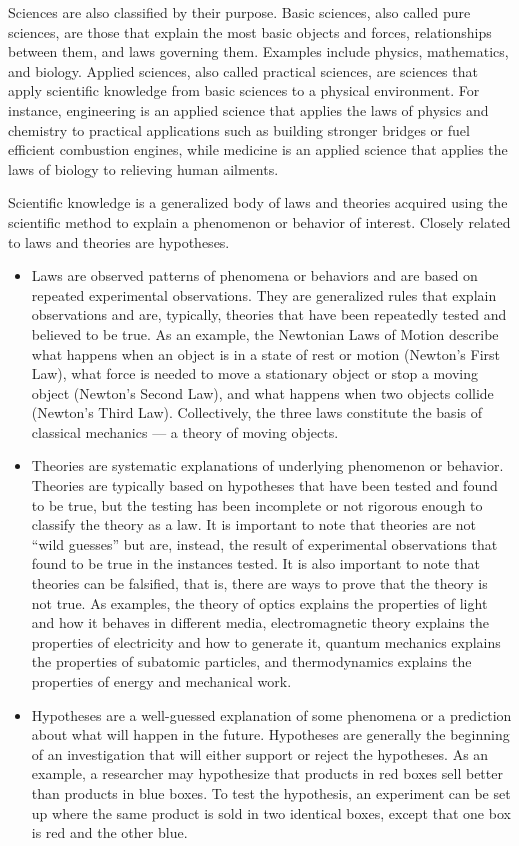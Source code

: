 \documentclass[]{book}
\theoremstyle{definition}
\theoremstyle{definition}
\theoremstyle{definition}
\theoremstyle{remark}
\begin{document}
Sciences are also classified by their purpose. Basic sciences, also
called pure sciences, are those that explain the most basic objects and
forces, relationships between them, and laws governing them. Examples
include physics, mathematics, and biology. Applied sciences, also called
practical sciences, are sciences that apply scientific knowledge from
basic sciences to a physical environment. For instance, engineering is
an applied science that applies the laws of physics and chemistry to
practical applications such as building stronger bridges or fuel
efficient combustion engines, while medicine is an applied science that
applies the laws of biology to relieving human ailments.

Scientific knowledge is a generalized body of laws and theories acquired
using the scientific method to explain a phenomenon or behavior of
interest. Closely related to laws and theories are hypotheses.

\begin{itemize}
\item
  Laws are observed patterns of phenomena or behaviors and are based on
  repeated experimental observations. They are generalized rules that
  explain observations and are, typically, theories that have been
  repeatedly tested and believed to be true. As an example, the
  Newtonian Laws of Motion describe what happens when an object is in a
  state of rest or motion (Newton's First Law), what force is needed to
  move a stationary object or stop a moving object (Newton's Second
  Law), and what happens when two objects collide (Newton's Third Law).
  Collectively, the three laws constitute the basis of classical
  mechanics --- a theory of moving objects.
\item
  Theories are systematic explanations of underlying phenomenon or
  behavior. Theories are typically based on hypotheses that have been
  tested and found to be true, but the testing has been incomplete or
  not rigorous enough to classify the theory as a law. It is important
  to note that theories are not ``wild guesses'' but are, instead, the
  result of experimental observations that found to be true in the
  instances tested. It is also important to note that theories can be
  falsified, that is, there are ways to prove that the theory is not
  true. As examples, the theory of optics explains the properties of
  light and how it behaves in different media, electromagnetic theory
  explains the properties of electricity and how to generate it, quantum
  mechanics explains the properties of subatomic particles, and
  thermodynamics explains the properties of energy and mechanical work.
\item
  Hypotheses are a well-guessed explanation of some phenomena or a
  prediction about what will happen in the future. Hypotheses are
  generally the beginning of an investigation that will either support
  or reject the hypotheses. As an example, a researcher may hypothesize
  that products in red boxes sell better than products in blue boxes. To
  test the hypothesis, an experiment can be set up where the same
  product is sold in two identical boxes, except that one box is red and
  the other blue.
\end{itemize}
\end{document}
